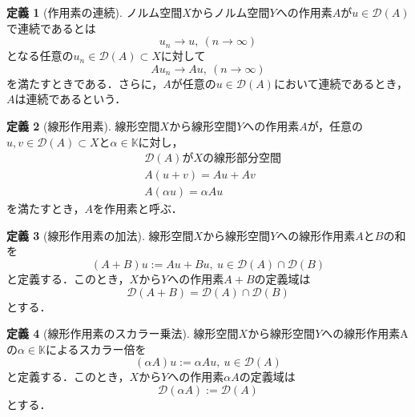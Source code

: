 \documentclass[11pt,a4paper,titlepage]{jsreport}
\theoremstyle{definition}
\newtheorem{dfn}{定義}
\begin{document}
\begin{dfn}[作用素の連続]
  ノルム空間$X$からノルム空間$Y$への作用素$A$が$u\in\mathcal{D}(A)$で連続であるとは
  \begin{equation*}
    u_n \rightarrow u, \ (n\rightarrow \infty)
  \end{equation*}
  となる任意の$u_n\in\mathcal{D}(A)\subset X$に対して
  \begin{equation*}
    Au_n\rightarrow Au, \ (n\rightarrow \infty)
  \end{equation*}
  を満たすときである．さらに，$A$が任意の$u\in\mathcal{D}(A)$において連続であるとき，$A$は連続であるという．
\end{dfn}

\begin{dfn}[線形作用素]
  線形空間$X$から線形空間$Y$への作用素$A$が，任意の$u,v\in\mathcal{D}(A)\subset X$と$\alpha\in\mathbb{K}$に対し，
  \begin{align*}
     & \mathcal{D}(A)がXの線形部分空間 \\
     & A(u+v)=Au+Av                    \\
     & A(\alpha u)=\alpha Au
  \end{align*}
  を満たすとき，$A$を作用素と呼ぶ．
\end{dfn}

\begin{dfn}[線形作用素の加法]
  \label{dfn:線形作用素の加法}
  線形空間$X$から線形空間$Y$への線形作用素$A$と$B$の和を
  \begin{equation*}
    (A+B)u := Au+Bu, \ u\in\mathcal{D}(A)\cap\mathcal{D}(B)
  \end{equation*}
  と定義する．このとき，$X$から$Y$への作用素$A+B$の定義域は
  \begin{equation*}
    \mathcal{D}(A+B) = \mathcal{D}(A)\cap\mathcal{D}(B)
  \end{equation*}
  とする．
\end{dfn}

\begin{dfn}[線形作用素のスカラー乗法]
  \label{dfn:線形作用素のスカラー乗法}
  線形空間$X$から線形空間$Y$への線形作用素Aの$\alpha\in\mathbb{K}$によるスカラー倍を
  \begin{equation*}
    (\alpha A)u := \alpha Au, \ u\in\mathcal{D}(A)
  \end{equation*}
  と定義する．このとき，$X$から$Y$への作用素$\alpha A$の定義域は
  \begin{equation*}
    \mathcal{D}(\alpha A):= \mathcal{D}(A)
  \end{equation*}
  とする．
\end{dfn}
\end{document}
